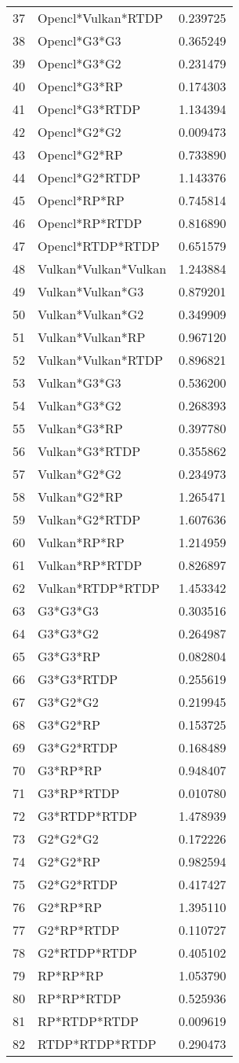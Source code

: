 \begin{tabular}{llr}
37 & Opencl*Vulkan*RTDP & 0.239725 \\
38 & Opencl*G3*G3 & 0.365249 \\
39 & Opencl*G3*G2 & 0.231479 \\
40 & Opencl*G3*RP & 0.174303 \\
41 & Opencl*G3*RTDP & 1.134394 \\
42 & Opencl*G2*G2 & 0.009473 \\
43 & Opencl*G2*RP & 0.733890 \\
44 & Opencl*G2*RTDP & 1.143376 \\
45 & Opencl*RP*RP & 0.745814 \\
46 & Opencl*RP*RTDP & 0.816890 \\
47 & Opencl*RTDP*RTDP & 0.651579 \\
48 & Vulkan*Vulkan*Vulkan & 1.243884 \\
49 & Vulkan*Vulkan*G3 & 0.879201 \\
50 & Vulkan*Vulkan*G2 & 0.349909 \\
51 & Vulkan*Vulkan*RP & 0.967120 \\
52 & Vulkan*Vulkan*RTDP & 0.896821 \\
53 & Vulkan*G3*G3 & 0.536200 \\
54 & Vulkan*G3*G2 & 0.268393 \\
55 & Vulkan*G3*RP & 0.397780 \\
56 & Vulkan*G3*RTDP & 0.355862 \\
57 & Vulkan*G2*G2 & 0.234973 \\
58 & Vulkan*G2*RP & 1.265471 \\
59 & Vulkan*G2*RTDP & 1.607636 \\
60 & Vulkan*RP*RP & 1.214959 \\
61 & Vulkan*RP*RTDP & 0.826897 \\
62 & Vulkan*RTDP*RTDP & 1.453342 \\
63 & G3*G3*G3 & 0.303516 \\
64 & G3*G3*G2 & 0.264987 \\
65 & G3*G3*RP & 0.082804 \\
66 & G3*G3*RTDP & 0.255619 \\
67 & G3*G2*G2 & 0.219945 \\
68 & G3*G2*RP & 0.153725 \\
69 & G3*G2*RTDP & 0.168489 \\
70 & G3*RP*RP & 0.948407 \\
71 & G3*RP*RTDP & 0.010780 \\
72 & G3*RTDP*RTDP & 1.478939 \\
73 & G2*G2*G2 & 0.172226 \\
74 & G2*G2*RP & 0.982594 \\
75 & G2*G2*RTDP & 0.417427 \\
76 & G2*RP*RP & 1.395110 \\
77 & G2*RP*RTDP & 0.110727 \\
78 & G2*RTDP*RTDP & 0.405102 \\
79 & RP*RP*RP & 1.053790 \\
80 & RP*RP*RTDP & 0.525936 \\
81 & RP*RTDP*RTDP & 0.009619 \\
82 & RTDP*RTDP*RTDP & 0.290473 \\
\end{tabular}
